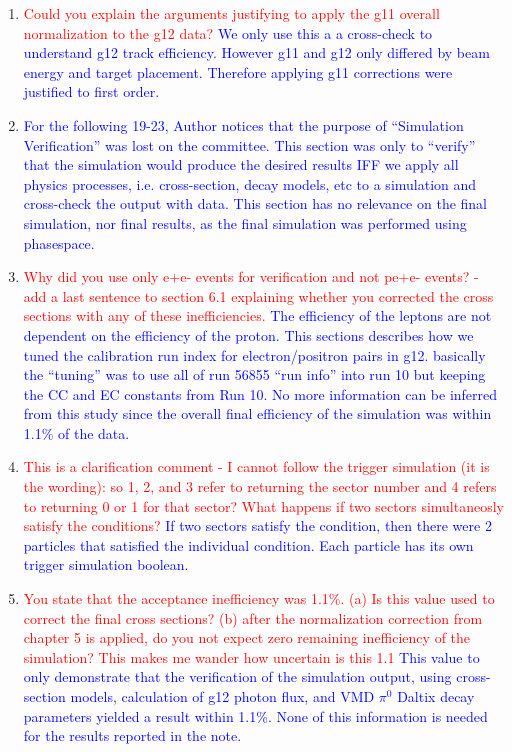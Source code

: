 \documentclass[11pt,a4paper]{article}
\begin{document}
\begin{enumerate}
\item
\textcolor{red}{Could you explain the arguments justifying to apply the g11 overall normalization to the g12 data?}
\textcolor{blue}{We only use this a a cross-check to understand g12 track efficiency. However g11 and g12 only differed by beam energy and target placement. Therefore applying g11 corrections were justified to first order.}
\item
\textcolor{blue}{For the following 19-23, Author notices that the purpose of ``Simulation Verification'' was lost on the committee. This section was only to ``verify'' that the simulation would produce the desired results IFF we apply all physics processes, i.e. cross-section, decay models, etc to a simulation and cross-check the output with data. This section has no relevance on the final simulation, nor final results,  as the final simulation was performed using phasespace.}
\item
\textcolor{red}{Why did you use only e+e- events for verification and not pe+e- events?
- add a last sentence to section 6.1 explaining whether you corrected the cross sections with
any of these inefficiencies.}
\textcolor{blue}{The efficiency of the leptons are not dependent on the efficiency of the proton. This sections describes how we tuned the calibration run index for electron/positron pairs in g12. basically the ``tuning'' was to use all of run 56855 ``run info'' into run 10 but keeping the CC and EC constants from Run 10. No more information can be inferred from this study since the overall final efficiency of the simulation was within 1.1\% of the data.}
\item
\textcolor{red}{This is a clarification comment - I cannot follow the trigger simulation (it is the wording): so 1, 2, and 3 refer to returning the sector number and 4 refers to returning 0 or 1 for that sector? What happens if two sectors simultaneosly satisfy the conditions?}
\textcolor{blue}{If two sectors satisfy the condition, then there were 2 particles that satisfied the individual condition. Each particle has its own trigger simulation boolean.}
\item
\textcolor{red}{You state that the acceptance inefficiency was 1.1\%. (a) Is this value used to correct the final cross sections? (b) after the normalization correction from chapter 5 is applied, do you not expect zero remaining inefficiency of the simulation? This makes me wander how uncertain is this 1.1%
}
\textcolor{blue}{This value to only demonstrate that the verification of the simulation output, using cross-section models, calculation of g12 photon flux, and VMD $\pi^0$ Daltix decay parameters yielded a result within 1.1\%. None of this information is needed for the results reported in the note.}

\end{enumerate}
\end{document}

